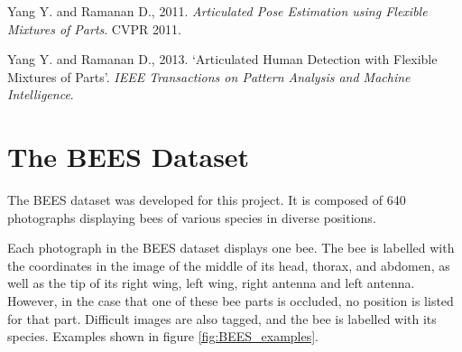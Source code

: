 \documentclass[11pt, oneside]{report}
\begin{document}
Yang Y. and Ramanan D., 2011. \textit{Articulated Pose Estimation using Flexible Mixtures of Parts}. CVPR 2011.

Yang Y. and Ramanan D., 2013. `Articulated Human Detection with Flexible Mixtures of Parts'. \textit{IEEE Transactions on Pattern Analysis and Machine Intelligence}.



\appendix
\chapter{The BEES Dataset}
    The BEES dataset was developed for this project. It is composed of 640 photographs displaying bees of various species in diverse positions.

    Each photograph in the BEES dataset displays one bee. The bee is labelled with the coordinates in the image of the middle of its head, thorax, and abdomen, as well as the tip of its right wing, left wing, right antenna and left antenna. However, in the case that one of these bee parts is occluded, no position is listed for that part. Difficult images are also tagged, and the bee is labelled with its species. Examples shown in figure \ref{fig:BEES_examples}.
\end{document}

